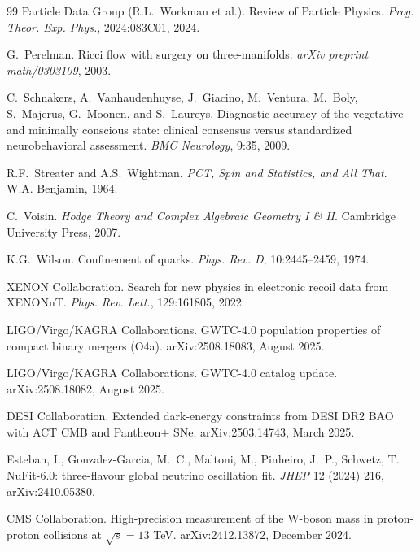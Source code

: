\documentclass[11pt,a4paper]{amsart}
\theoremstyle{plain}
\theoremstyle{definition}
\begin{document}
\begin{thebibliography}{99}
Particle Data Group (R.L.~Workman et al.).
\newblock Review of Particle Physics.
\newblock \emph{Prog. Theor. Exp. Phys.}, 2024:083C01, 2024.

G.~Perelman.
\newblock Ricci flow with surgery on three-manifolds.
\newblock \emph{arXiv preprint math/0303109}, 2003.

C.~Schnakers, A.~Vanhaudenhuyse, J.~Giacino, M.~Ventura, M.~Boly, S.~Majerus, G.~Moonen, and S.~Laureys.
\newblock Diagnostic accuracy of the vegetative and minimally conscious state: clinical consensus versus standardized neurobehavioral assessment.
\newblock \emph{BMC Neurology}, 9:35, 2009.

R.F.~Streater and A.S.~Wightman.
\newblock \emph{PCT, Spin and Statistics, and All That}.
\newblock W.A. Benjamin, 1964.

C.~Voisin.
\newblock \emph{Hodge Theory and Complex Algebraic Geometry I \& II}.
\newblock Cambridge University Press, 2007.

K.G.~Wilson.
\newblock Confinement of quarks.
\newblock \emph{Phys. Rev. D}, 10:2445--2459, 1974.

XENON Collaboration.
\newblock Search for new physics in electronic recoil data from XENONnT.
\newblock \emph{Phys. Rev. Lett.}, 129:161805, 2022.

LIGO/Virgo/KAGRA Collaborations.
\newblock GWTC-4.0 population properties of compact binary mergers (O4a).
\newblock arXiv:2508.18083, August 2025.

LIGO/Virgo/KAGRA Collaborations.
\newblock GWTC-4.0 catalog update.
\newblock arXiv:2508.18082, August 2025.

DESI Collaboration.
\newblock Extended dark-energy constraints from DESI DR2 BAO with ACT CMB and Pantheon$+$ SNe.
\newblock arXiv:2503.14743, March 2025.

Esteban, I., Gonzalez-Garcia, M.~C., Maltoni, M., Pinheiro, J.~P., Schwetz, T.
\newblock NuFit-6.0: three-flavour global neutrino oscillation fit.
\newblock \emph{JHEP} 12 (2024) 216, arXiv:2410.05380.

CMS Collaboration.
\newblock High-precision measurement of the W-boson mass in proton-proton collisions at $\sqrt{s} = 13$ TeV.
\newblock arXiv:2412.13872, December 2024.


\end{thebibliography}
\end{document}
